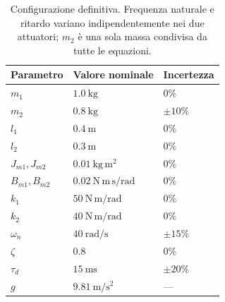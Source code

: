 \begin{table}[htbp]\centering\small
\begin{tabular}{lll}\toprule
Parametro & Valore nominale & Incertezza\\\midrule
$m_1$ & $1.0\ \mathrm{kg}$ & $0\%$\\
$m_2$ & $0.8\ \mathrm{kg}$ & $\pm10\%$\\
$l_1$ & $0.4\ \mathrm{m}$ & $0\%$\\
$l_2$ & $0.3\ \mathrm{m}$ & $0\%$\\
$J_{m1},J_{m2}$ & $0.01\ \mathrm{kg\,m^2}$ & $0\%$\\
$B_{m1},B_{m2}$ & $0.02\ \mathrm{N\,m\,s/rad}$ & $0\%$\\
$k_1$ & $50\ \mathrm{N\,m/rad}$ & $0\%$\\
$k_2$ & $40\ \mathrm{N\,m/rad}$ & $0\%$\\
$\omega_n$ & $40\ \mathrm{rad/s}$ & $\pm15\%$\\
$\zeta$ & $0.8$ & $0\%$\\
$\tau_d$ & $15\ \mathrm{ms}$ & $\pm20\%$\\
$g$ & $9.81\ \mathrm{m/s^2}$ & ---\\\bottomrule
\end{tabular}
\caption{Configurazione definitiva. Frequenza naturale e ritardo variano indipendentemente nei due attuatori; $m_2$ è una sola massa condivisa da tutte le equazioni.}\label{tab:parametri-definitivi}
\end{table}
